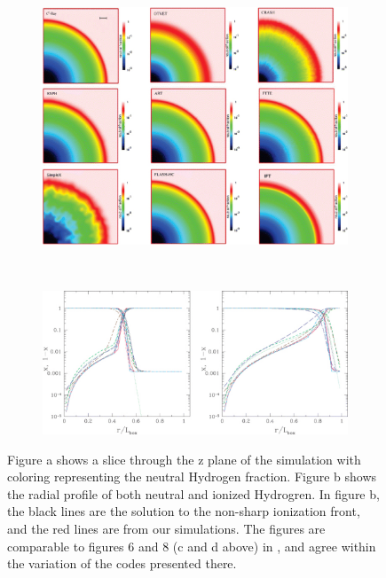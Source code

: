 \begin{figure}
\begin{subfigure}[b]{0.45\textwidth}
        \end{subfigure}
		\\        
        \begin{subfigure}[b]{0.45\textwidth}
                \includegraphics[width=\textwidth]{graphics/iliev06f6.eps}
                \caption{}
                \label{fig:ilievEtf6}
        \end{subfigure}
        ~
        \begin{subfigure}[b]{0.45\textwidth}
                \includegraphics[width=\textwidth]{graphics/iliev06f8.eps}
                \caption{}
                \label{fig:ilievEtf8}
        \end{subfigure}
        \caption[The isothermal Str\"omgren Sphere.]{Figure a shows a slice through the z plane of the simulation with coloring representing the neutral Hydrogen fraction. Figure b shows the radial profile of both neutral and ionized Hydrogren. In figure b, the black lines are the solution to the non-sharp ionization front, and the red lines are from our simulations. The figures are comparable to figures 6 and 8 (c and d above) in \citet{ilievEt06}, and agree within the variation of the codes presented there.}
        \label{fig:stromgreniso}
\end{figure}


